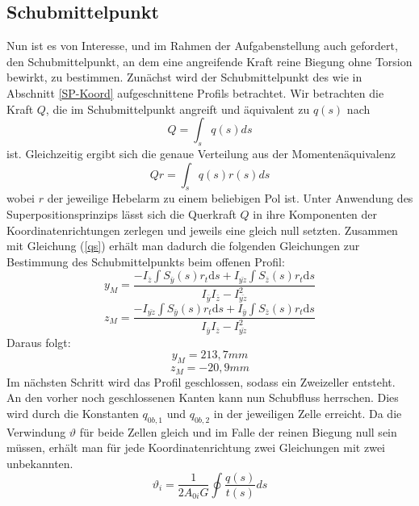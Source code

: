 \subsection{Schubmittelpunkt}
Nun ist es von Interesse, und im Rahmen der Aufgabenstellung auch gefordert, den Schubmittelpunkt, an dem eine angreifende Kraft reine Biegung ohne Torsion bewirkt, zu bestimmen.
Zunächst wird der Schubmittelpunkt des wie in Abschnitt \ref{SP-Koord} aufgeschnittene Profils betrachtet. Wir betrachten die Kraft $Q$, die im Schubmittelpunkt angreift und äquivalent zu $q(s)$ nach
\begin{equation}
	Q=\int_{s}^{}q(s)ds
\end{equation}
ist. Gleichzeitig ergibt sich die genaue Verteilung aus der Momentenäquivalenz 
\begin{equation}
	Qr=\int_{s}q(s)r(s)ds
\end{equation}
wobei $r$ der jeweilige Hebelarm zu einem beliebigen Pol ist. Unter Anwendung des Superpositionsprinzips lässt sich die Querkraft $Q$ in ihre Komponenten der  Koordinatenrichtungen zerlegen und jeweils eine gleich null setzten. Zusammen mit Gleichung (\ref{qs}) erhält man dadurch die folgenden Gleichungen zur Bestimmung des Schubmittelpunkts beim offenen Profil:
\begin{equation}
	y_{M}=\frac{-I_{\bar{z}}\int S_{\bar{y}}(s) r_{t}\mathrm{d}s+I_{\bar{yz}}\int S_{\bar{z}}(s) r_{t}\mathrm{d}s}{I_{\bar{y}}I_{\bar{z}}-I_{\bar{yz}}^2}
\end{equation}
\begin{equation}
	z_{M}=\frac{-I_{\bar{yz}}\int S_{\bar{y}}(s) r_{t}\mathrm{d}s+I_{\bar{y}}\int S_{\bar{z}}(s) r_{t}\mathrm{d}s}{I_{\bar{y}}I_{\bar{z}}-I_{\bar{yz}}^2}
\end{equation}
Daraus folgt:
\begin{equation}
	y_{M}=213,7mm
\end{equation}
\begin{equation}
	z_{M}=-20,9mm
\end{equation}
Im nächsten Schritt wird das Profil geschlossen, sodass ein Zweizeller entsteht. An den vorher noch geschlossenen Kanten kann nun Schubfluss herrschen. Dies wird durch die Konstanten $q_{0b,1}$ und $q_{0b,2}$ in der jeweiligen Zelle erreicht.
Da die Verwindung $\vartheta$ für beide Zellen gleich und im Falle der reinen Biegung null sein müssen, erhält man für jede Koordinatenrichtung zwei Gleichungen mit zwei unbekannten.
\begin{equation}\label{verdrillung}
	\vartheta_{i} = \frac{1}{2A_{0i}G}\oint\frac{q(s)}{t(s)}ds
\end{equation}
